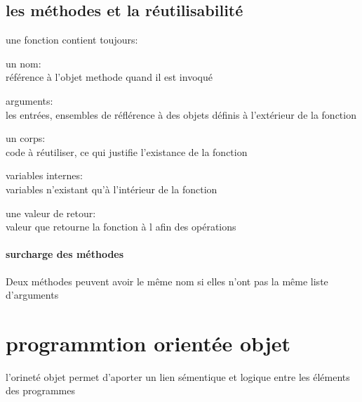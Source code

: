 \documentclass[a4paper,10pt]{article}
\begin{document}
\subsection{les méthodes et la réutilisabilité}
une fonction contient toujours:
\begin{description}
 \item un nom:\\{référence à l'objet methode quand il est invoqué}
 \item arguments:\\{les entrées, ensembles de réflérence à des objets définis à l'extérieur de la fonction}
 \item un corps:\\{code à réutiliser, ce qui justifie l'existance de la fonction}
 \item variables internes:\\{variables n'existant qu'à l'intérieur de la fonction}
 \item une valeur de retour:\\{valeur que retourne la fonction à l afin des opérations}
\end{description}
\paragraph{surcharge des méthodes}
Deux méthodes peuvent avoir le même nom si elles n'ont pas la même liste d'arguments
\section{programmtion orientée objet}
l'orineté objet permet d'aporter un lien sémentique et logique entre les éléments des programmes
\end{document}
